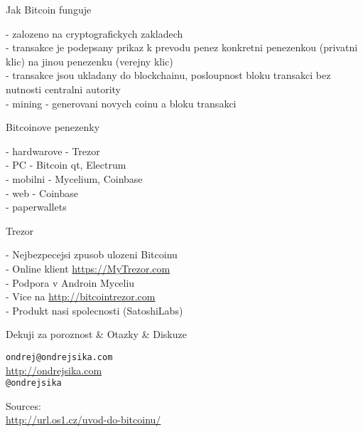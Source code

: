 \documentclass{beamer}
\begin{document}
\begin{frame}

    {\LARGE Jak Bitcoin funguje}\\

    \vspace{5mm}

    - zalozeno na cryptografickych zakladech\\
    - transakce je podepsany prikaz k prevodu penez konkretni penezenkou (privatni klic) na jinou penezenku (verejny klic)\\
    - transakce jsou ukladany do blockchainu, posloupnost bloku transakci bez nutnosti centralni autority\\
    - mining - generovani novych coinu a bloku transakci\\

\end{frame}

\begin{frame}

    {\LARGE Bitcoinove penezenky}\\

    \vspace{5mm}

    - hardwarove - Trezor\\
    - PC - Bitcoin qt, Electrum\\
    - mobilni - Mycelium, Coinbase\\
    - web - Coinbase\\
    - paperwallets\\

\end{frame}

\begin{frame}

    {\LARGE Trezor}\\

    \vspace{5mm}

    - Nejbezpecejsi zpusob ulozeni Bitcoinu\\
    - Online klient \url{https://MyTrezor.com}\\
    - Podpora v Androin Myceliu\\
    - Vice na \url{http://bitcointrezor.com}\\
    - Produkt nasi spolecnosti (SatoshiLabs)\\

\end{frame}

\begin{frame}

    {\LARGE Dekuji za poroznost \& Otazky \& Diskuze}\\

    \vspace{1cm}

    \texttt{ondrej@ondrejsika.com}\\
    \url{http://ondrejsika.com}\\
    \texttt{@ondrejsika}\\

    \vspace{1cm}

    Sources:\\
    \url{http://url.os1.cz/uvod-do-bitcoinu/}
\end{frame}
\end{document}
